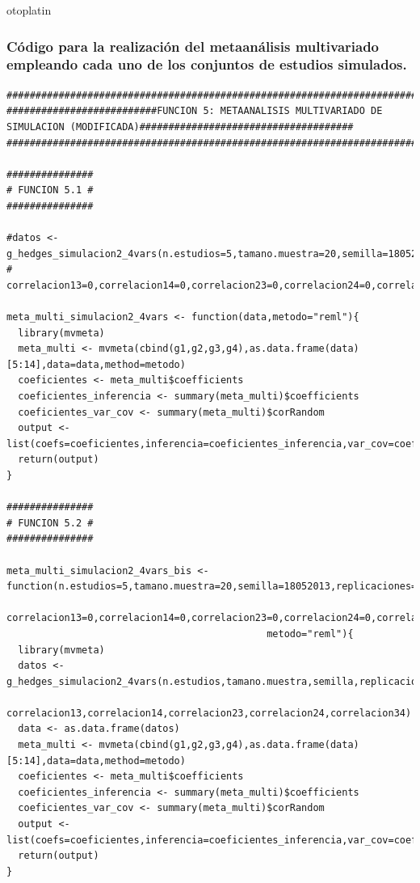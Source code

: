 otoplatin\documentclass[a4paper,openright,12pt]{report}
\begin{document}
\subsubsection{Código para la realización del metaanálisis multivariado empleando cada uno de los conjuntos de estudios simulados.}
{\tiny
\begin{verbatim}
##############################################################################################################################
##########################FUNCION 5: METAANALISIS MULTIVARIADO DE SIMULACION (MODIFICADA)#####################################
##############################################################################################################################

###############
# FUNCION 5.1 #
###############

#datos <- g_hedges_simulacion2_4vars(n.estudios=5,tamano.muestra=20,semilla=18052013,replicaciones=5,correlacion12=0,
#                                    correlacion13=0,correlacion14=0,correlacion23=0,correlacion24=0,correlacion34=0)

meta_multi_simulacion2_4vars <- function(data,metodo="reml"){
  library(mvmeta)
  meta_multi <- mvmeta(cbind(g1,g2,g3,g4),as.data.frame(data)[5:14],data=data,method=metodo)
  coeficientes <- meta_multi$coefficients
  coeficientes_inferencia <- summary(meta_multi)$coefficients
  coeficientes_var_cov <- summary(meta_multi)$corRandom
  output <- list(coefs=coeficientes,inferencia=coeficientes_inferencia,var_cov=coeficientes_var_cov)
  return(output)
}

###############
# FUNCION 5.2 #
###############

meta_multi_simulacion2_4vars_bis <- function(n.estudios=5,tamano.muestra=20,semilla=18052013,replicaciones=5,correlacion12=0,
                                             correlacion13=0,correlacion14=0,correlacion23=0,correlacion24=0,correlacion34=0,
                                             metodo="reml"){
  library(mvmeta)
  datos <- g_hedges_simulacion2_4vars(n.estudios,tamano.muestra,semilla,replicaciones,correlacion12,
                                      correlacion13,correlacion14,correlacion23,correlacion24,correlacion34)
  data <- as.data.frame(datos)
  meta_multi <- mvmeta(cbind(g1,g2,g3,g4),as.data.frame(data)[5:14],data=data,method=metodo)
  coeficientes <- meta_multi$coefficients
  coeficientes_inferencia <- summary(meta_multi)$coefficients
  coeficientes_var_cov <- summary(meta_multi)$corRandom
  output <- list(coefs=coeficientes,inferencia=coeficientes_inferencia,var_cov=coeficientes_var_cov)
  return(output)  
}


\end{verbatim}}
\end{document}
